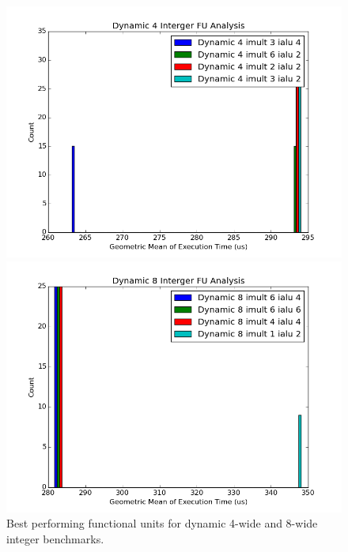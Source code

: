 \documentclass[paper=a4, fontsize=12pt]{scrartcl} %
\numberwithin{equation}{section} %
\numberwithin{figure}{section} %
\numberwithin{table}{section} %
\begin{document}
\begin{figure}
\centering
\begin{minipage}{0.5\textwidth}
\centering
	\includegraphics[width=\linewidth]{graphs/Functional_Units/hardware_int/Dynamic_4_Interger_FU_Analysis.png}
\end{minipage}\hfill
\begin{minipage}{0.5\textwidth}
\centering
 \includegraphics[width=\linewidth]{graphs/Functional_Units/hardware_int/Dynamic_8_Interger_FU_Analysis.png}
\end{minipage}

\caption{Best performing functional units for dynamic 4-wide and 8-wide integer benchmarks.}
\label{fig:hardware_int}
\end{figure}
\end{document}
